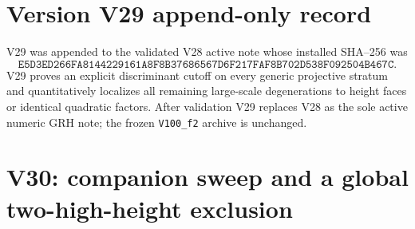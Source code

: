 \documentclass[11pt]{article}
\theoremstyle{definition}
\theoremstyle{remark}
\begin{document}
\section*{Version V29 append-only record}

V29 was appended to the validated V28 active note whose installed
SHA--256 was
\[
 \texttt{E5D3ED266FA8144229161A8F8B37686567D6F217FAF8B702D538F092504B467C}.
 \tag{N29.29}
\]
V29 proves an explicit discriminant cutoff on every generic projective
stratum and quantitatively localizes all remaining large-scale
degenerations to height faces or identical quadratic factors.  After
validation V29 replaces V28 as the sole active numeric GRH note; the
frozen \texttt{V100\_f2} archive is unchanged.



\section{V30: companion sweep and a global two-high-height exclusion}
\label{sec:f2v30-two-high}
\end{document}
